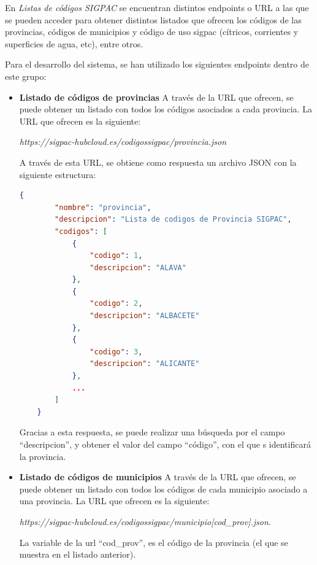 En \textit{Listas de códigos SIGPAC} se encuentran distintos endpoints o URL a las que se pueden acceder para obtener 
distintos listados que ofrecen los códigos de las provincias, códigos de municipios y código de uso sigpac (cítricos,
corrientes y superficies de agua, etc), entre otros.

Para el desarrollo del sistema, se han utilizado los siguientes endpoints dentro de este grupo:

\begin{itemize}
    \item \textbf{Listado de códigos de provincias}
    \newline
    A través de la URL que ofrecen, se puede obtener un listado con todos los códigos asociados a cada provincia.
    La URL que ofrecen es la siguiente:
    
    \textit{https://sigpac-hubcloud.es/codigossigpac/provincia.json}

    A través de esta URL, se obtiene como respuesta un archivo JSON con la siguiente estructura:

    \begin{lstlisting}[language=json,caption={Listado de provincias SIGPAC}]
    {
        "nombre": "provincia",
        "descripcion": "Lista de codigos de Provincia SIGPAC",
        "codigos": [
            {
                "codigo": 1,
                "descripcion": "ALAVA"
            },
            {
                "codigo": 2,
                "descripcion": "ALBACETE"
            },
            {
                "codigo": 3,
                "descripcion": "ALICANTE"
            },
            ...
        ]
    }
    \end{lstlisting}

    Gracias a esta respuesta, se puede realizar una búsqueda por el campo ``descripcion'', y obtener el valor del 
    campo ``código'', con el que s identificará la provincia.

    \item \textbf{Listado de códigos de municipios}
    \newline
    A través de la URL que ofrecen, se puede obtener un listado con todos los códigos de cada municipio asociado
    a una provincia.
    La URL que ofrecen es la siguiente:
    
    \textit{https://sigpac-hubcloud.es/codigossigpac/municipio[cod\_prov].json}. 
  
    La variable de la url ``cod\_prov'', es el código de la provincia (el que se muestra en el listado anterior).


\end{itemize}
